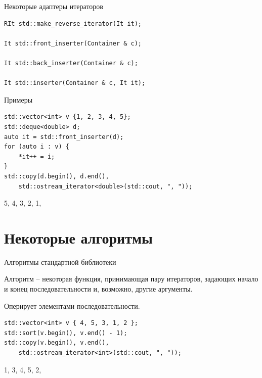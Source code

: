 \documentclass[unknownkeysallowed,xcolor=table]{beamer}
\begin{document}
\begin{frame}[fragile]{Некоторые адаптеры итераторов}

\begin{lstlisting}
RIt std::make_reverse_iterator(It it);

It std::front_inserter(Container & c);

It std::back_inserter(Container & c);

It std::inserter(Container & c, It it);
\end{lstlisting}

\end{frame}

\begin{frame}[fragile]{Примеры}

\begin{lstlisting}
std::vector<int> v {1, 2, 3, 4, 5};
std::deque<double> d;
auto it = std::front_inserter(d);
for (auto i : v) {
    *it++ = i;
}
std::copy(d.begin(), d.end(),
    std::ostream_iterator<double>(std::cout, ", "));
\end{lstlisting}

\begin{cmdlinelarge}
5, 4, 3, 2, 1,
\end{cmdlinelarge}

\end{frame}


\section{Некоторые алгоритмы}

\begin{frame}[fragile]{Алгоритмы стандартной библиотеки}

Алгоритм -- некоторая функция, принимающая пару итераторов, задающих начало и конец последовательности и, возможно, другие аргументы.

Оперирует элементами последовательности.

\vspace{2em}

\begin{lstlisting}
std::vector<int> v { 4, 5, 3, 1, 2 };
std::sort(v.begin(), v.end() - 1);
std::copy(v.begin(), v.end(),
    std::ostream_iterator<int>(std::cout, ", "));
\end{lstlisting}

\begin{cmdlinelarge}
1, 3, 4, 5, 2,
\end{cmdlinelarge}

\end{frame}
\end{document}
